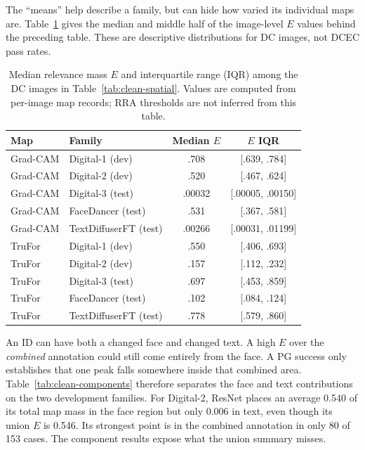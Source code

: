 The ``means'' help describe a family, but can hide how varied its individual maps are. Table~\ref{tab:clean-spatial-median} gives the median and middle half of the image-level $E$ values behind the preceding table. These are descriptive distributions for DC images, not DCEC pass rates.

\begin{table}[htbp]
\centering\small
\caption{Median relevance mass $E$ and interquartile range (IQR) among the DC images in Table~\ref{tab:clean-spatial}. Values are computed from per-image map records; RRA thresholds are not inferred from this table.}
\label{tab:clean-spatial-median}
\begin{tabular}{@{}ll|c|c@{}}
\toprule
Map & Family & Median $E$ & $E$ IQR \\
\midrule
Grad-CAM & Digital-1 (dev) & .708 & [.639, .784] \\
Grad-CAM & Digital-2 (dev) & .520 & [.467, .624] \\
Grad-CAM & Digital-3 (test) & .00032 & [.00005, .00150] \\
Grad-CAM & FaceDancer (test) & .531 & [.367, .581] \\
Grad-CAM & TextDiffuserFT (test) & .00266 & [.00031, .01199] \\
\addlinespace
TruFor & Digital-1 (dev) & .550 & [.406, .693] \\
TruFor & Digital-2 (dev) & .157 & [.112, .232] \\
TruFor & Digital-3 (test) & .697 & [.453, .859] \\
TruFor & FaceDancer (test) & .102 & [.084, .124] \\
TruFor & TextDiffuserFT (test) & .778 & [.579, .860] \\
\bottomrule
\end{tabular}
\end{table}

\newpage
An ID can have both a changed face and changed text. A high $E$ over the \emph{combined} annotation could still come entirely from the face. A PG success only establishes that one peak falls somewhere inside that combined area. Table~\ref{tab:clean-components} therefore separates the face and text contributions on the two development families. For Digital-2, ResNet places an average 0.540 of its total map mass in the face region but only 0.006 in text, even though its union $E$ is 0.546. Its strongest point is in the combined annotation in only 80 of 153 cases. The component results expose what the union summary misses.

